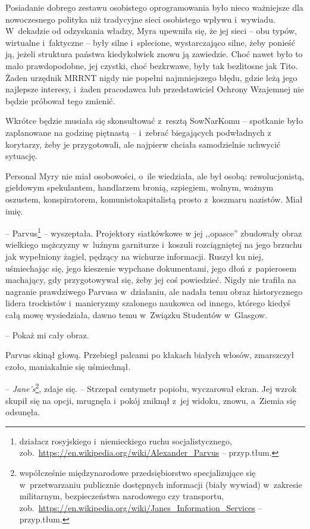 \documentclass[oneside,polish,11pt,sfheadings]{mwbk}
\begin{document}
Posiadanie dobrego zestawu osobistego oprogramowania było nieco
ważniejsze dla nowoczesnego polityka niż tradycyjne sieci osobistego
wpływu i~wywiadu. W~dekadzie od odzyskania władzy, Myra upewniła się, że
jej sieci -- obu typów, wirtualne i~faktyczne -- były silne i~splecione,
wystarczająco silne, żeby ponieść ją, jeżeli struktura państwa
kiedykolwiek znowu ją zawiedzie. Choć nawet było to mało prawdopodobne,
jej czystki, choć bezkrwawe, były tak bezlitosne jak Tito. Żaden
urzędnik MRRNT nigdy nie popełni najmniejszego błędu, gdzie leżą jego
najlepsze interesy, i~żaden pracodawca lub przedstawiciel Ochrony
Wzajemnej nie będzie próbował tego zmienić.

Wkrótce będzie musiała się skonsultować z~resztą SowNarKomu -- spotkanie
było zaplanowane na godzinę piętnastą -- i~zebrać biegających podwładnych
z korytarzy, żeby je przygotowali, ale najpierw chciała samodzielnie
uchwycić sytuację.

Personal Myry nie miał osobowości, o~ile wiedziała, ale był osobą:
rewolucjonistą, giełdowym spekulantem, handlarzem bronią, szpiegiem,
wolnym, ważnym oszustem, konspiratorem, komunisto\dywiz kapitalistą prosto z~koszmaru nazistów. Miał imię.

-- Parvus\footnote{ działacz rosyjskiego i~niemieckiego ruchu socjalistycznego,
zob.~\url{https://en.wikipedia.org/wiki/Alexander\_Parvus} -- przyp.tłum.} -- wyszeptała. Projektory siatkówkowe w jej ,,opasce''
zbudowały obraz wielkiego mężczyzny w~luźnym garniturze i~koszuli
rozciągniętej na jego brzuchu jak wypełniony żagiel, pędzący na wichurze
informacji. Ruszył ku niej, uśmiechając się, jego kieszenie wypchane
dokumentami, jego dłoń z~papierosem machający, gdy przygotowywał się,
żeby jej coś powiedzieć. Nigdy nie trafiła na nagranie prawdziwego
Parvusa w~działaniu, ale nadała temu obraz historycznego lidera
trockistów i~manieryzmy szalonego naukowca od innego, którego kiedyś
całą mowę wysiedziała, dawno temu w~Związku Studentów w~Glasgow.

-- Pokaż mi cały obraz.

Parvus skinął głową. Przebiegł palcami po kłakach białych włosów,
zmarszczył czoło, maniakalnie się uśmiechnął.

-- \textit{Jane's}\footnote{ współcześnie międzynarodowe przedsiębiorstwo
specjalizujące się w~przetwarzaniu publicznie dostępnych informacji
(biały wywiad) w~zakresie militarnym, bezpieczeństwa narodowego czy
transportu,
zob.~\url{https://en.wikipedia.org/wiki/Janes\_Information\_Services}
-- przyp.tłum.}, zdaje się. -- Strzepał centymetr popiołu, wyczarował
ekran. Jej wzrok skupił się na opcji, mrugnęła i~pokój zniknął z~jej
widoku, znowu, a~Ziemia się odsunęła.
\end{document}
